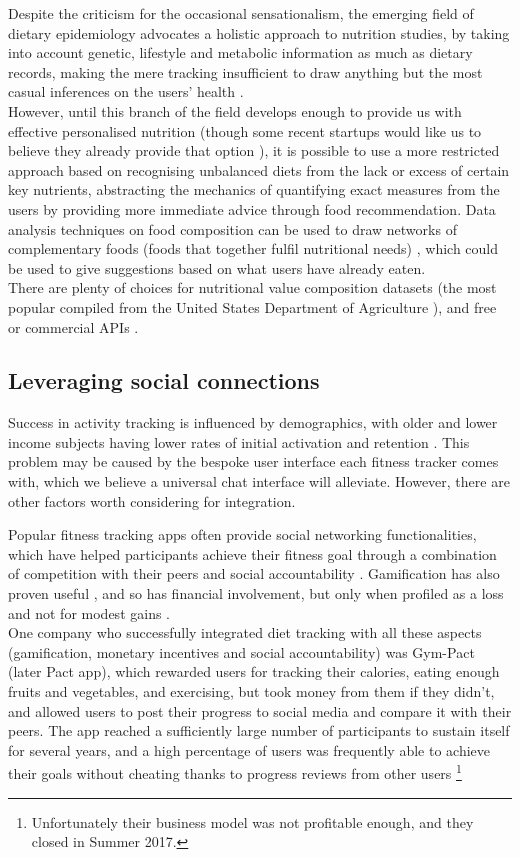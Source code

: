 Despite the criticism for the occasional sensationalism, the emerging field of dietary epidemiology advocates a holistic approach to nutrition studies, by taking into account genetic, lifestyle and metabolic information as much as dietary records, making the mere tracking insufficient to draw anything but the most casual inferences on the users' health \cite{byers2001food}. \\
However, until this branch of the field develops enough to provide us with effective personalised nutrition (though some recent startups would like us to believe they already provide that option \cite{habitwebsite}), it is possible to use a more restricted approach based on recognising unbalanced diets from the lack or excess of certain key nutrients, abstracting the mechanics of quantifying exact measures from the users by providing more immediate advice through food recommendation. Data analysis techniques on food composition can be used to draw networks of complementary foods (foods that together fulfil nutritional needs) \cite{Kim2015a}, which could be used to give suggestions based on what users have already eaten. \\
There are plenty of choices for nutritional value composition datasets (the most popular compiled from the United States Department of Agriculture \cite{usda}), and free or commercial APIs \cite{foodapis}.
\subsection{Leveraging social connections}
Success in activity tracking is influenced by demographics, with older and lower income subjects having lower rates of initial activation and retention \cite{Patel2017}. This problem may be caused by the bespoke user interface each fitness tracker comes with, which we believe a universal chat interface will alleviate. However, there are other factors worth considering for integration. 

Popular fitness tracking apps often provide social networking functionalities, which have helped participants achieve their fitness goal through a combination of competition with their peers and social accountability \cite{chenchen2014}. Gamification has also proven useful \cite{doi:10.1001/jamainternmed.2017.3458}, and so has financial involvement, but only when profiled as a loss and not for modest gains \cite{doi:10.7326/M15-1635}. \\
One company who successfully integrated diet tracking with all these aspects (gamification, monetary incentives and social accountability) was Gym-Pact (later Pact app), which rewarded users for tracking their calories, eating enough fruits and vegetables, and exercising, but took money from them if they didn't, and allowed users to post their progress to social media and compare it with their peers. The app reached a sufficiently large number of participants \cite{nudgingpracticioner} to sustain itself for several years, and a high percentage of users was frequently able to achieve their goals without cheating thanks to progress reviews from other users \footnote{Unfortunately their business model was not profitable enough, and they closed in Summer 2017.}

